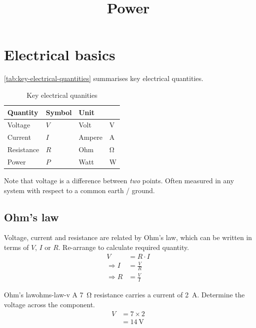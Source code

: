 \documentclass{pgnotes}
\title{Power}
\begin{document}
\maketitle

\section{Electrical basics}

\autoref{tab:key-electrical-quantities} summarises key electrical quantities.

\begin{table}[htbp]
  \centering
  \begin{tabular}{l l l l}
    \toprule
    \textbf{Quantity} & \textbf{Symbol} & \textbf{Unit} & ~ \\
    \midrule
    Voltage & $V$ & Volt & \si{\volt} \\
    Current & $I$ & Ampere & \si{\ampere} \\
    Resistance & $R$ & Ohm & \si{\ohm} \\
    Power & $P$ & Watt & \si{\watt} \\
    \bottomrule
  \end{tabular}
  \caption{Key electrical quanities}
  \label{tab:key-electrical-quantities}
\end{table}

Note that voltage is a difference between \textit{two} points.
Often measured in any system with respect to a common earth / ground.

\subsection{Ohm's law}
  
Voltage, current and resistance are related by Ohm's law, which can be written in terms of $V$, $I$ or $R$.
Re-arrange to calculate required quantity.
\begin{align}
  V & = R \cdot I \\
  \Rightarrow I & = \frac{V}{R} \\
  \Rightarrow R & = \frac{V}{I}      
\end{align}

\begin{example}{Ohm's law}{ohms-law-v}
  A \SI{7}{\ohm} resistance carries a current of \SI{2}{\ampere}.
  Determine the voltage across the component.
  \tcblower
  \begin{align}
    V & = 7 \times 2 \\
      & = \SI{14}{\volt}
  \end{align}
\end{example}
\end{document}
